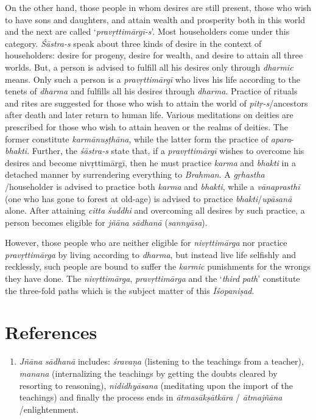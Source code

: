 On the other hand, those people in whom desires are still present, those who wish to have sons and daughters, and attain wealth and prosperity both in this world and the next are called `\emph{pravṛttimārgī-s}'. Most householders come under this category. \emph{Śāstra-s} speak about three kinds of desire in the context of householders: desire for progeny, desire for wealth, and desire to attain all three worlds. But, a person is advised to fulfill all his desires only through \emph{dharmic} means. Only such a person is a \emph{pravṛttimārgī} who lives his life according to the tenets of \emph{dharma} and fulfills all his desires through \emph{dharma}. Practice of rituals and rites are suggested for those who wish to attain the world of \emph{pitṛ-s}/ancestors after death and later return to human life. Various meditations on deities are prescribed for those who wish to attain heaven or the realms of deities. The former constitute \emph{karmānuṣṭhāna}, while the latter form the practice of \emph{apara}-\emph{bhakti}. Further, the \emph{śāstra-s} state that, if a \emph{pravṛttimārgī} wishes to overcome his desires and become nivṛttimārgī, then he must practice \emph{karma} and \emph{bhakti} in a detached manner by surrendering everything to \emph{Brahman}. A \emph{gṛhastha} /householder is advised to practice both \emph{karma} and \emph{bhakti}, while a \emph{vānaprasthī} (one who has gone to forest at old-age) is advised to practice \emph{bhakti}/\emph{upāsanā} alone. After attaining \emph{citta} \emph{śuddhi} and overcoming all desires by such practice, a person becomes eligible for \emph{jñāna} \emph{sādhanā} (\emph{sannyāsa}).

However, those people who are neither eligible for \emph{nivṛttimārga} nor practice \emph{pravṛttimārga} by living according to \emph{dharma}, but instead live life selfishly and recklessly, such people are bound to suffer the \emph{karmic} punishments for the wrongs they have done. The \emph{nivṛttimārga}, \emph{pravṛttimārga} and the `\emph{third} \emph{path}' constitute the three-fold paths which is the subject matter of this \emph{Īśopaniṣad}.

\section*{References}

\begin{enumerate}
\itemsep=0pt
\item
  \emph{Jñāna} \emph{sādhanā} includes: \emph{śravaṇa} (listening to the teachings from a teacher), \emph{manana} (internalizing the teachings by getting the doubts cleared by resorting to reasoning), \emph{nididhyāsana} (meditating upon the import of the teachings) and finally the process ends in \emph{ātmasākṣātkāra} / \emph{ātmajñāna} /enlightenment.
\end{enumerate}
